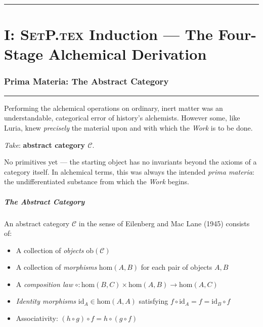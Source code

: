 \documentclass[12pt,a4paper]{article}
\begin{document}
\begin{center}
\rule{0.5\textwidth}{0.4pt}
\end{center}

\newpage

\part{I: \textsc{SetP.tex} Induction --- The Four-Stage Alchemical Derivation}
\label{part:i}

\section{Prima Materia: The Abstract Category}

\begin{center}
\rule{0.5\textwidth}{0.4pt}
\end{center}

Performing the alchemical operations on ordinary, inert matter was an understandable, categorical error of history's alchemists.  However some, like Luria, knew \emph{precisely} the material upon and with which the \emph{Work} is to be done.

\emph{Take}: \textbf{abstract category \(\mathcal{C}\)}.

No primitives yet --- the starting object has no invariants beyond the axioms of a category itself.  In alchemical terms, this was always the intended \emph{prima materia}: the undifferentiated substance from which the \emph{Work} begins.

\subsubsection{The Abstract Category}

An abstract category $\mathcal{C}$ in the sense of Eilenberg and Mac Lane (1945) consists of:
\begin{itemize}
    \item A collection of \emph{objects} $\text{ob}(\mathcal{C})$
    \item A collection of \emph{morphisms} $\text{hom}(A, B)$ for each pair of objects $A, B$
    \item A \emph{composition law} $\circ: \text{hom}(B,C) \times \text{hom}(A,B) \to \text{hom}(A,C)$
    \item \emph{Identity morphisms} $\text{id}_A \in \text{hom}(A,A)$ satisfying $f \circ \text{id}_A = f = \text{id}_B \circ f$
    \item Associativity: $(h \circ g) \circ f = h \circ (g \circ f)$
\end{itemize}
\end{document}
